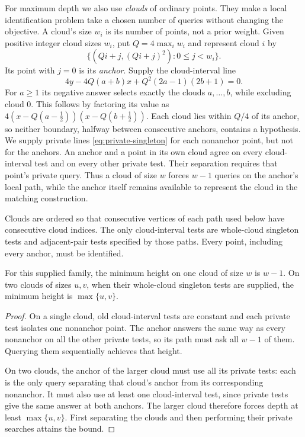 For maximum depth we also use \emph{clouds} of ordinary points.
They make a local identification problem take a chosen number of
queries without changing the objective. A cloud's size $w_i$ is
its number of points, not a prior weight.
Given positive integer cloud sizes $w_i$, put $Q=4\max_i w_i$
and represent cloud $i$ by
\[
 \{(Qi+j,(Qi+j)^2):0\le j<w_i\}.
\]
Its point with $j=0$ is its \emph{anchor}. Supply the cloud-interval line
\begin{equation}\label{eq:cloud-interval}
 4y-4Q(a+b)x+Q^2(2a-1)(2b+1)=0.
\end{equation}
For $a\ge1$ its negative answer selects exactly the clouds
$a,\ldots,b$, while excluding cloud $0$.
This follows by factoring its value as
$4(x-Q(a-\tfrac12))(x-Q(b+\tfrac12))$.
Each cloud lies within $Q/4$ of its anchor, so neither boundary,
halfway between consecutive anchors, contains a hypothesis.
We supply private lines \eqref{eq:private-singleton} for each
nonanchor point, but not for the anchors. An anchor and a point
in its own cloud agree on every cloud-interval test and on every
other private test. Their separation requires that point's
private query. Thus a cloud of size $w$ forces $w-1$ queries on
the anchor's local path, while the anchor itself remains available
to represent the cloud in the matching construction.

Clouds are ordered so that consecutive vertices of each path used
below have consecutive cloud indices. The only cloud-interval tests
are whole-cloud singleton tests and adjacent-pair tests specified
by those paths. Every point, including every anchor, must be identified.

\begin{lemma}\label{lem:cloud-heights}
For this supplied family, the minimum height on one cloud of size $w$
is $w-1$. On two clouds of sizes $u,v$, when their whole-cloud
singleton tests are supplied, the minimum height is $\max\{u,v\}$.
\end{lemma}
\begin{proof}
On a single cloud, old cloud-interval tests are constant and each
private test isolates one nonanchor point. The anchor answers the
same way as every nonanchor on all the other private tests, so its
path must ask all $w-1$ of them. Querying them sequentially achieves
that height.

On two clouds, the anchor of the larger cloud must use all its
private tests: each is the only query separating that cloud's anchor
from its corresponding nonanchor. It must also use at least one
cloud-interval test, since private tests give the same answer at
both anchors. The larger cloud therefore forces depth at least
$\max\{u,v\}$.
First separating the clouds and then performing their private
searches attains the bound.
\end{proof}

